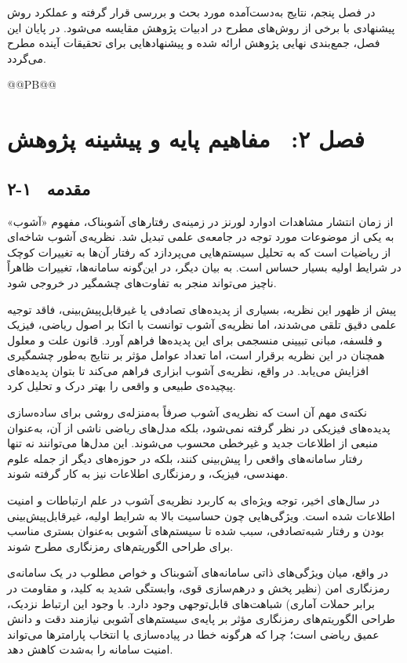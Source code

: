 در فصل پنجم، نتایج به‌دست‌آمده مورد بحث و بررسی قرار گرفته و عملکرد روش پیشنهادی با برخی از روش‌های مطرح در ادبیات پژوهش مقایسه می‌شود. در پایان این فصل، جمع‌بندی نهایی پژوهش ارائه شده و پیشنهادهایی برای تحقیقات آینده مطرح می‌گردد.


@@PB@@







\chapter{فصل ۲:  مفاهیم پایه و پیشینه پژوهش}
\section{۲-۱  مقدمه}

از زمان انتشار مشاهدات ادوارد لورنز در زمینه‌ی رفتارهای آشوبناک، مفهوم «آشوب» به یکی از موضوعات مورد توجه در جامعه‌ی علمی تبدیل شد. نظریه‌ی آشوب شاخه‌ای از ریاضیات است که به تحلیل سیستم‌هایی می‌پردازد که رفتار آن‌ها به تغییرات کوچک در شرایط اولیه بسیار حساس است. به بیان دیگر، در این‌گونه سامانه‌ها، تغییرات ظاهراً ناچیز می‌تواند منجر به تفاوت‌های چشمگیر در خروجی شود.

پیش از ظهور این نظریه، بسیاری از پدیده‌های تصادفی یا غیرقابل‌پیش‌بینی، فاقد توجیه علمی دقیق تلقی می‌شدند، اما نظریه‌ی آشوب توانست با اتکا بر اصول ریاضی، فیزیک و فلسفه، مبانی تبیینی منسجمی برای این پدیده‌ها فراهم آورد. قانون علت و معلول همچنان در این نظریه برقرار است، اما تعداد عوامل مؤثر بر نتایج به‌طور چشمگیری افزایش می‌یابد. در واقع، نظریه‌ی آشوب ابزاری فراهم می‌کند تا بتوان پدیده‌های پیچیده‌ی طبیعی و واقعی را بهتر درک و تحلیل کرد.

نکته‌ی مهم آن است که نظریه‌ی آشوب صرفاً به‌منزله‌ی روشی برای ساده‌سازی پدیده‌های فیزیکی در نظر گرفته نمی‌شود، بلکه مدل‌های ریاضی ناشی از آن، به‌عنوان منبعی از اطلاعات جدید و غیرخطی محسوب می‌شوند. این مدل‌ها می‌توانند نه تنها رفتار سامانه‌های واقعی را پیش‌بینی کنند، بلکه در حوزه‌های دیگر از جمله علوم مهندسی، فیزیک، و رمزنگاری اطلاعات نیز به کار گرفته شوند.

در سال‌های اخیر، توجه ویژه‌ای به کاربرد نظریه‌ی آشوب در علم ارتباطات و امنیت اطلاعات شده است. ویژگی‌هایی چون حساسیت بالا به شرایط اولیه، غیرقابل‌پیش‌بینی بودن و رفتار شبه‌تصادفی، سبب شده تا سیستم‌های آشوبی به‌عنوان بستری مناسب برای طراحی الگوریتم‌های رمزنگاری مطرح شوند.

در واقع، میان ویژگی‌های ذاتی سامانه‌های آشوبناک و خواص مطلوب در یک سامانه‌ی رمزنگاری امن (نظیر پخش و درهم‌سازی قوی، وابستگی شدید به کلید، و مقاومت در برابر حملات آماری) شباهت‌های قابل‌توجهی وجود دارد. با وجود این ارتباط نزدیک، طراحی الگوریتم‌های رمزنگاری مؤثر بر پایه‌ی سیستم‌های آشوبی نیازمند دقت و دانش عمیق ریاضی است؛ چرا که هرگونه خطا در پیاده‌سازی یا انتخاب پارامترها می‌تواند امنیت سامانه را به‌شدت کاهش دهد.

